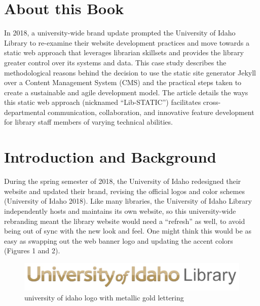 \documentclass{book}
\begin{document}
\chapter*{About this Book}
In 2018, a university-wide brand update prompted the University of Idaho
Library to re-examine their website development practices and move towards a
static web approach that leverages librarian skillsets and provides the
library greater control over its systems and data. This case study describes
the methodological reasons behind the decision to use the static site
generator Jekyll over a Content Management System (CMS) and the practical
steps taken to create a sustainable and agile development model. The article
details the ways this static web approach (nicknamed ``Lib-STATIC'')
facilitates cross-departmental communication, collaboration, and innovative
feature development for library staff members of varying technical abilities.

\setcounter{tocdepth}{3}
\tableofcontents

\mainmatter

\hypertarget{introduction-and-background}{%
\chapter{Introduction and Background}\label{introduction-and-background}}

During the spring semester of 2018, the University of Idaho redesigned their
website and updated their brand, revising the official logos and color schemes
(University of Idaho 2018). Like many libraries, the University of Idaho
Library independently hosts and maintains its own website, so this
university-wide rebranding meant the library website would need a ``refresh''
as well, to avoid being out of sync with the new look and feel. One might
think this would be as easy as swapping out the web banner logo and updating
the accent colors (Figures 1 and 2).

\begin{figure}
\centering
\includegraphics{DtNFdB.jpg}
\caption{university of idaho logo with metallic gold lettering}
\end{figure}
\end{document}
